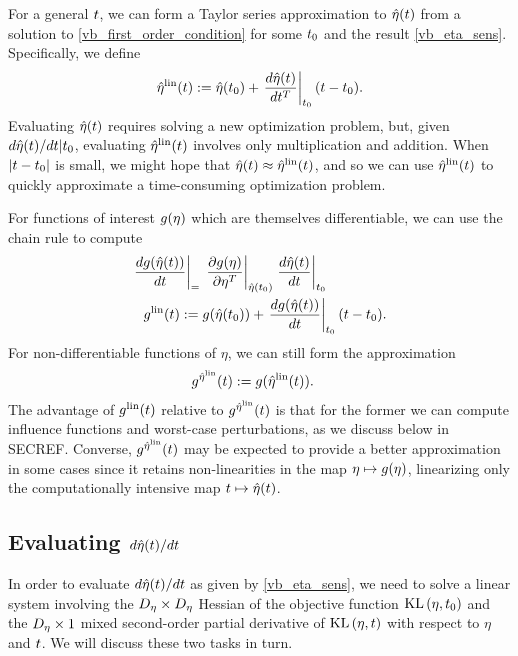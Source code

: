 For a general $t$, we can form a Taylor series approximation to $\hat\eta(t)$
from a solution to \eqref{vb_first_order_condition} for some $t_0$ and the
result \eqref{vb_eta_sens}.  Specifically, we define
%
\begin{align*}
%
\etalin(\t) := \etaopt(\t_0) + \fracat{d \etaopt(\t)}{d \t^T}{\t_0} (\t - \t_0).
%
\end{align*}
%
Evaluating $\hat\eta(t)$ requires solving a new optimization problem, but, given
$d\hat\eta(t) / dt | t_0$, evaluating $\hat\eta^{\mathrm{lin}}(t)$ involves only
multiplication and addition.  When $|t - t_0|$ is small, we might hope
that $\hat\eta(t) \approx \hat\eta^{\mathrm{lin}}(t)$, and so we can use $\hat\eta^{\mathrm{lin}}(t)$
to quickly approximate a time-consuming optimization problem.

For functions of interest $g(\eta)$ which are themselves differentiable,
we can use the chain rule to compute
%
\begin{align*}
%
\fracat{d g(\etaopt(\t))}{d\t} ={}&
    \fracat{\partial g(\eta)}{\partial \eta^T}{\etaopt(\t_0)}
    \fracat{d \etaopt(\t)}{d \t}{\t_0} \\
\glin(\t) :={}& \g(\etaopt(\t_0)) + \fracat{d g(\etaopt(\t))}{d\t}{\t_0} (\t - \t_0).
%
\end{align*}
%
For non-differentiable functions of $\eta$, we can still form the approximation
%
\begin{align*}
%
\gapprox(\t) :={}& \g(\etalin(\t)).
%
\end{align*}
%
The advantage of $g^{\mathrm{lin}}(t)$ relative to $g^{\hat\eta^{\mathrm{lin}}}(t)$ is that for the former
we can compute influence functions and worst-case perturbations, as we discuss
below in SECREF.  Converse, $g^{\hat\eta^{\mathrm{lin}}}(t)$ may be expected to provide a better
approximation in some cases since it retains non-linearities in the map $\eta
\mapsto g(\eta)$, linearizing only the computationally intensive map $t
\mapsto \hat\eta(t)$.


\subsection{Evaluating $d\hat\eta(t) / dt$}

In order to evaluate $d\hat\eta(t) / dt$ as given by \eqref{vb_eta_sens}, we
need to solve a linear system involving the $D_{\eta} \times D_{\eta}$ Hessian of
the objective function $\mathrm{KL}\left(\eta, t_0\right)$ and the $D_{\eta} \times 1$ mixed
second-order partial derivative of $\mathrm{KL}\left(\eta, t\right)$ with respect to $\eta$ and
$t$.  We will discuss these two tasks in turn.

